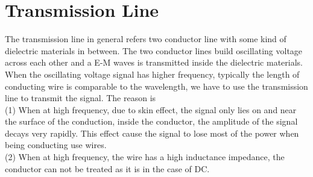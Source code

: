 \documentclass[a4paper]{article}
\begin{document}
\section{Transmission Line}
The transmission line in general refers two conductor line with some kind of dielectric materials in between. The two conductor lines build oscillating voltage across each other and a E-M waves is transmitted inside the dielectric materials.
When the oscillating voltage signal has higher frequency, typically the length of conducting wire is comparable to the wavelength, we have to use the transmission line to transmit the signal. The reason is\\
(1) When at high frequency, due to skin effect, the signal only lies on and near the surface of the conduction, inside the conductor, the amplitude of the signal decays very rapidly. This effect cause the signal to lose most of the power when being conducting use wires.\\
(2) When at high frequency, the wire has a high inductance impedance, the conductor can not be treated as it is in the case of DC.
\end{document}
